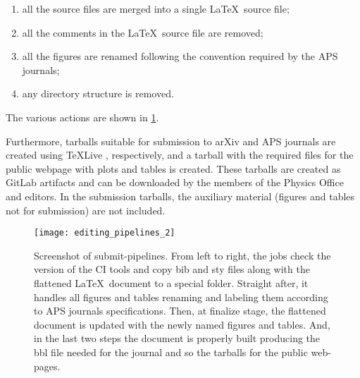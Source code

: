 \begin{enumerate}
\item all the source files are merged into a single \LaTeX\ source file;
\item all the comments in the \LaTeX\ source file are removed;
\item all the figures are renamed following the convention required by the APS journals;
\item any directory structure is removed.
\end{enumerate}
The various actions are shown in \cref{fig:submit-pipelines}.

Furthermore, tarballs suitable for submission to arXiv and APS journals are created using \TeX{}Live , respectively, and a tarball with the required files for the public webpage with plots and tables is created. These tarballs are created as GitLab artifacts and can be downloaded by the members of the Physics Office and editors. In the submission tarballs, the auxiliary material (figures and tables not for submission) are not included.

\begin{figure}[htb]
  \centering
  \texttt{[image: editing\_pipelines\_2]}
  \caption{Screenshot of submit-pipelines. From left to right, the jobs check the version of the CI tools and copy bib and sty files along with the flattened \LaTeX\ document to a special folder. Straight after, it handles all figures and tables renaming and labeling them according to APS journals specifications. Then, at finalize stage, the flattened document is updated with the newly named figures and tables. And, in the last two steps the document is properly built producing the bbl file needed for the journal and so the tarballs for the public web-pages.}%
  \label{fig:submit-pipelines}
\end{figure}



